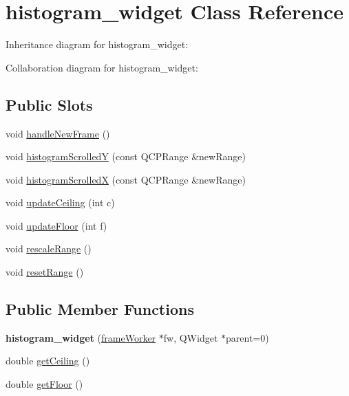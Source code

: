 \hypertarget{classhistogram__widget}{\section{histogram\+\_\+widget Class Reference}
\label{classhistogram__widget}
}


Inheritance diagram for histogram\+\_\+widget\+:


Collaboration diagram for histogram\+\_\+widget\+:
\subsection*{Public Slots}
\begin{DoxyCompactItemize}
\item 
void \hyperlink{group__renderfunc_ga8167d1f53c918dc651e589cef592b359}{handle\+New\+Frame} ()
\item 
void \hyperlink{group__plotfunc_ga97e017f73cc11f779e8c79105d8aea43}{histogram\+Scrolled\+Y} (const Q\+C\+P\+Range \&new\+Range)
\item 
void \hyperlink{group__plotfunc_gaee461cb6e6adc4eca240bac3ed00b3a8}{histogram\+Scrolled\+X} (const Q\+C\+P\+Range \&new\+Range)
\item 
void \hyperlink{group__plotfunc_ga2a4bb2a69816bf4370bf6e8bb6a917ad}{update\+Ceiling} (int c)
\item 
void \hyperlink{group__plotfunc_gaebb6be44eb733ec6b1a5e46ad38071c6}{update\+Floor} (int f)
\item 
void \hyperlink{group__plotfunc_gab1d2aa3969a6455b12d8d630d8a271b4}{rescale\+Range} ()
\item 
void \hyperlink{group__plotfunc_ga2e72b7c626e51d26af1cae0f1199d3e1}{reset\+Range} ()
\end{DoxyCompactItemize}
\subsection*{Public Member Functions}
\begin{DoxyCompactItemize}
\item 
\hypertarget{classhistogram__widget_ad1d36c6f798f476603f4f34118a708bb}{{\bfseries histogram\+\_\+widget} (\hyperlink{classframeWorker}{frame\+Worker} $\ast$fw, Q\+Widget $\ast$parent=0)}\label{classhistogram__widget_ad1d36c6f798f476603f4f34118a708bb}

\item 
double \hyperlink{group__getters_gaf5feaf6965cdfac1bbf9be88f0a6c86b}{get\+Ceiling} ()
\item 
double \hyperlink{group__getters_ga425122f9d79ceb31f8ed8b1bc54c380f}{get\+Floor} ()
\end{DoxyCompactItemize}
